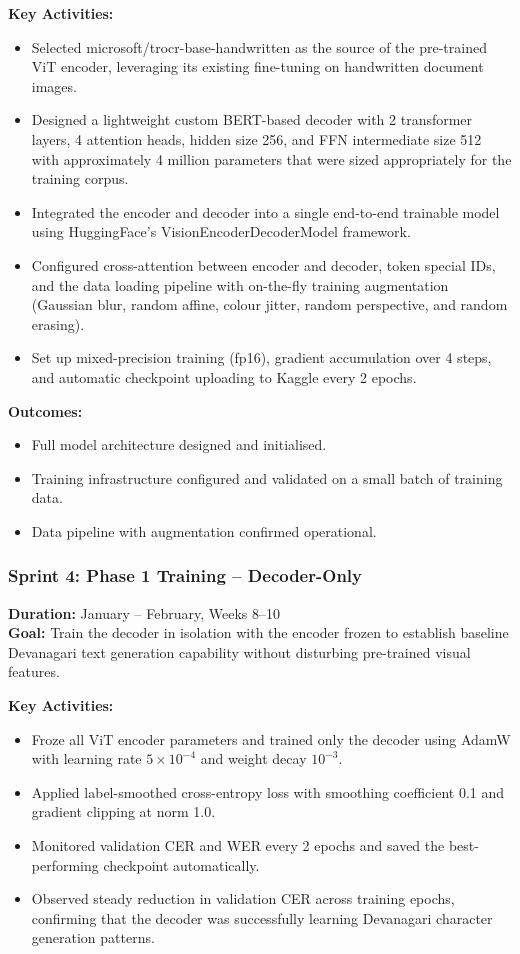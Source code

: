\textbf{Key Activities:}
\begin{itemize}
    \item Selected microsoft/trocr-base-handwritten as the 
    source of the pre-trained ViT encoder, leveraging its existing 
    fine-tuning on handwritten document images.
    \item Designed a lightweight custom BERT-based decoder with 2 transformer layers, 4 attention heads, hidden size 256, and FFN intermediate size 512 with approximately 4 million parameters that were sized appropriately for the training corpus.
    \item Integrated the encoder and decoder into a single end-to-end trainable model using HuggingFace's 
 VisionEncoderDecoderModel framework.
    \item Configured cross-attention between encoder and decoder, 
    token special IDs, and the data loading pipeline with on-the-fly 
    training augmentation (Gaussian blur, random affine, colour 
    jitter, random perspective, and random erasing).
    \item Set up mixed-precision training (fp16), gradient 
    accumulation over 4 steps, and automatic checkpoint uploading 
    to Kaggle every 2 epochs.
\end{itemize}

\textbf{Outcomes:}
\begin{itemize}
    \item Full model architecture designed and initialised.
    \item Training infrastructure configured and validated on a 
    small batch of training data.
    \item Data pipeline with augmentation confirmed operational.
\end{itemize}

\subsubsection{Sprint 4: Phase 1 Training -- Decoder-Only}
\textbf{Duration:} January -- February, Weeks 8--10\\
\textbf{Goal:} Train the decoder in isolation with the encoder frozen 
to establish baseline Devanagari text generation capability without 
disturbing pre-trained visual features.

\textbf{Key Activities:}
\begin{itemize}
    \item Froze all ViT encoder parameters and trained only the 
    decoder using AdamW with learning rate $5 \times 10^{-4}$ and 
    weight decay $10^{-3}$.
    \item Applied label-smoothed cross-entropy loss with smoothing 
    coefficient 0.1 and gradient clipping at norm 1.0.
    \item Monitored validation CER and WER every 2 epochs and saved 
    the best-performing checkpoint automatically.
    \item Observed steady reduction in validation CER across 
    training epochs, confirming that the decoder was successfully 
    learning Devanagari character generation patterns.
\end{itemize}

